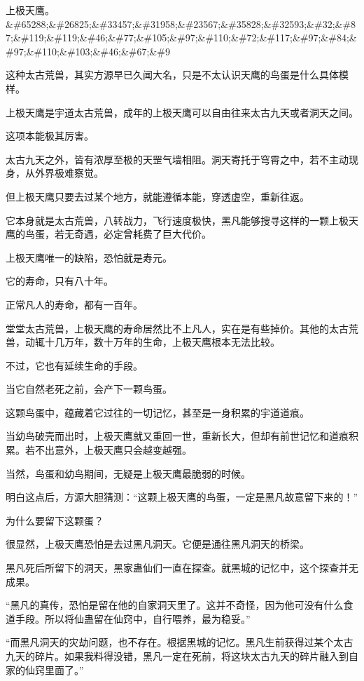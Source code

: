 
\begin{this_body}

上极天鹰。\&\#65288;\&\#26825;\&\#33457;\&\#31958;\&\#23567;\&\#35828;\&\#32593;\&\#32;\&\#87;\&\#119;\&\#119;\&\#46;\&\#77;\&\#105;\&\#97;\&\#110;\&\#72;\&\#117;\&\#97;\&\#84;\&\#97;\&\#110;\&\#103;\&\#46;\&\#67;\&\#9

这种太古荒兽，其实方源早已久闻大名，只是不太认识天鹰的鸟蛋是什么具体模样。

上极天鹰是宇道太古荒兽，成年的上极天鹰可以自由往来太古九天或者洞天之间。

这项本能极其厉害。

太古九天之外，皆有浓厚至极的天罡气墙相阻。洞天寄托于穹霄之中，若不主动现身，从外界极难察觉。

但上极天鹰只要去过某个地方，就能遵循本能，穿透虚空，重新往返。

它本身就是太古荒兽，八转战力，飞行速度极快，黑凡能够搜寻这样的一颗上极天鹰的鸟蛋，若无奇遇，必定曾耗费了巨大代价。

上极天鹰唯一的缺陷，恐怕就是寿元。

它的寿命，只有八十年。

正常凡人的寿命，都有一百年。

堂堂太古荒兽，上极天鹰的寿命居然比不上凡人，实在是有些掉价。其他的太古荒兽，动辄十几万年，数十万年的生命，上极天鹰根本无法比较。

不过，它也有延续生命的手段。

当它自然老死之前，会产下一颗鸟蛋。

这颗鸟蛋中，蕴藏着它过往的一切记忆，甚至是一身积累的宇道道痕。

当幼鸟破壳而出时，上极天鹰就又重回一世，重新长大，但却有前世记忆和道痕积累。若不出意外，上极天鹰只会越变越强。

当然，鸟蛋和幼鸟期间，无疑是上极天鹰最脆弱的时候。

明白这点后，方源大胆猜测：“这颗上极天鹰的鸟蛋，一定是黑凡故意留下来的！”

为什么要留下这颗蛋？

很显然，上极天鹰恐怕是去过黑凡洞天。它便是通往黑凡洞天的桥梁。

黑凡死后所留下的洞天，黑家蛊仙们一直在探查。就黑城的记忆中，这个探查并无成果。

“黑凡的真传，恐怕是留在他的自家洞天里了。这并不奇怪，因为他可没有什么食道手段。所以将仙蛊留在仙窍中，自行喂养，最为稳妥。”

“而黑凡洞天的灾劫问题，也不存在。根据黑城的记忆。黑凡生前获得过某个太古九天的碎片。如果我料得没错，黑凡一定在死前，将这块太古九天的碎片融入到自家的仙窍里面了。”


\end{this_body}

